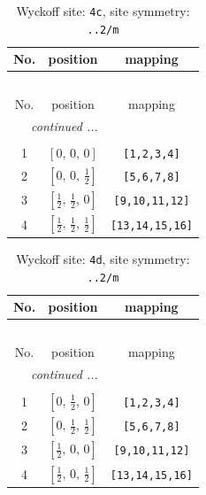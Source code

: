 \documentclass[fleqn,8pt]{jsarticle}
\begin{document}
\renewcommand{\arraystretch}{1.2}
\begin{longtable}{ccc}
\caption{Wyckoff site: {\tt 4c}, site symmetry: {\tt ..2/m}}
 \\
 \hline \hline
No. & position & mapping \\ \hline \endfirsthead

\multicolumn{2}{l}{\tablename\ \thetable{}} \\
 \hline \hline
No. & position & mapping \\ \hline \endhead

 \hline \hline
\multicolumn{2}{r}{\footnotesize\it continued ...} \\ \endfoot

 \hline \hline
\multicolumn{2}{r}{} \\ \endlastfoot

1 & $\left[ 0,\, 0,\, 0 \right]$ & {\tt [1,2,3,4]} \\ \hline
2 & $\left[ 0,\, 0,\, \frac{1}{2} \right]$ & {\tt [5,6,7,8]} \\ \hline
3 & $\left[ \frac{1}{2},\, \frac{1}{2},\, 0 \right]$ & {\tt [9,10,11,12]} \\ \hline
4 & $\left[ \frac{1}{2},\, \frac{1}{2},\, \frac{1}{2} \right]$ & {\tt [13,14,15,16]} \\
\end{longtable}
\renewcommand{\arraystretch}{1.2}
\begin{longtable}{ccc}
\caption{Wyckoff site: {\tt 4d}, site symmetry: {\tt ..2/m}}
 \\
 \hline \hline
No. & position & mapping \\ \hline \endfirsthead

\multicolumn{2}{l}{\tablename\ \thetable{}} \\
 \hline \hline
No. & position & mapping \\ \hline \endhead

 \hline \hline
\multicolumn{2}{r}{\footnotesize\it continued ...} \\ \endfoot

 \hline \hline
\multicolumn{2}{r}{} \\ \endlastfoot

1 & $\left[ 0,\, \frac{1}{2},\, 0 \right]$ & {\tt [1,2,3,4]} \\ \hline
2 & $\left[ 0,\, \frac{1}{2},\, \frac{1}{2} \right]$ & {\tt [5,6,7,8]} \\ \hline
3 & $\left[ \frac{1}{2},\, 0,\, 0 \right]$ & {\tt [9,10,11,12]} \\ \hline
4 & $\left[ \frac{1}{2},\, 0,\, \frac{1}{2} \right]$ & {\tt [13,14,15,16]} \\
\end{longtable}
\end{document}
